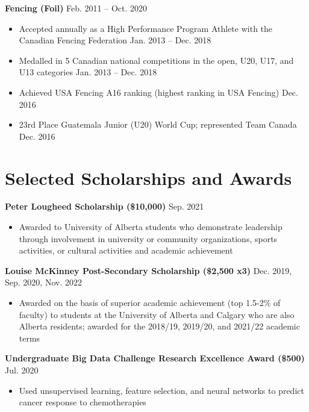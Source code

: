 \documentclass{article}
\begin{document}
\textbf{Fencing (Foil)} \hfill Feb. 2011 -- Oct. 2020
\begin{itemize}
    \item Accepted annually as a High Performance Program Athlete with the Canadian Fencing Federation \hfill Jan. 2013 -- Dec. 2018
    \item Medalled in 5 Canadian national competitions in the open, U20, U17, and U13 categories \hfill Jan. 2013 -- Dec. 2018
    \item Achieved USA Fencing A16 ranking (highest ranking in USA Fencing) \hfill Dec. 2016
    \item 23rd Place Guatemala Junior (U20) World Cup; represented Team Canada \hfill Dec. 2016
\end{itemize}


\section*{\textcolor{my_colour}{Selected Scholarships and Awards} }
\vspace{-.25em} \hrulefill \vspace{.25em}

\textbf{Peter Lougheed Scholarship (\$10,000)} \hfill Sep. 2021
\begin{itemize}
    \item Awarded to University of Alberta students who demonstrate leadership through involvement in university or community organizations, sports activities, or cultural activities and academic achievement
\end{itemize} \vspace{1em}

\textbf{Louise McKinney Post-Secondary Scholarship (\$2,500 x3)} \hfill Dec. 2019, Sep. 2020, Nov. 2022
\begin{itemize}
    \item Awarded on the basis of superior academic achievement (top 1.5-2\% of faculty) to students at the University of Alberta and Calgary who are also Alberta residents; awarded for the 2018/19, 2019/20, and 2021/22 academic terms
\end{itemize} \vspace{1em}

\textbf{Undergraduate Big Data Challenge Research Excellence Award (\$500)} \hfill Jul. 2020
\begin{itemize}
    \item Used unsupervised learning, feature selection, and neural networks to predict cancer response to chemotherapies
\end{itemize} \vspace{1em}
\end{document}
